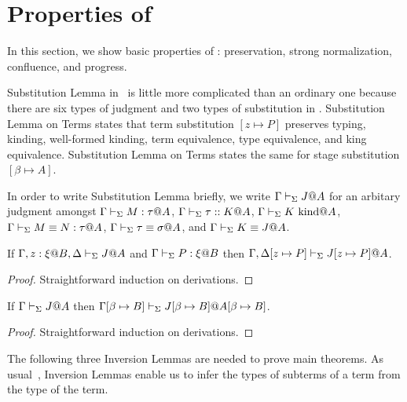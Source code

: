 
\section{Properties of \LMD \label{sec:properties}}

In this section, we show basic properties of \LMD: preservation, strong normalization, confluence, and progress.


Substitution Lemma in \LMD\ is little more complicated than an ordinary one 
because there are six types of judgment and two types of substitution in \LMD.
Substitution Lemma on Terms states that term substitution $[z \mapsto P]$ preserves
typing, kinding, well-formed kinding, term equivalence, type equivalence, and king equivalence.
Substitution Lemma on Terms states the same for stage substitution $[\beta\mapsto A]$.

In order to write Substitution Lemma briefly, we write $\Gamma\vdash_\Sigma J@A$ for an arbitary judgment
amongst $\G\V M:\tau@A$, $\Gamma\vdash_\Sigma \tau::K@A$, $\Gamma\vdash_\Sigma K \text{\ kind} @A$, $\Gamma\vdash_\Sigma M \equiv N : \tau @ A$, 
$\Gamma\vdash_\Sigma \tau \equiv \sigma @ A$, and $\Gamma \vdash_\Sigma K \equiv J @ A$.

\begin{lemma}
	If $\G, z:\xi@B, \D \V J @ A$ and $\Gamma\vdash_\Sigma P:\xi @B$ then $\Gamma, \Delta[z \mapsto P] \vdash_\Sigma J[z \mapsto P] @ A$.
\end{lemma}


\begin{proof}
	Straightforward induction on derivations.
\end{proof}

\begin{lemma}
	If $\Gamma \vdash_\Sigma J @ A$ then $\Gamma[\beta\mapsto B] \vdash_\Sigma J[\beta\mapsto B] @ A[\beta\mapsto B]$.
\end{lemma}

\begin{proof}
	Straightforward induction on derivations.
\end{proof}


The following three Inversion Lemmas are needed to prove main theorems.
As usual~\cite{TAPL}, Inversion Lemmas enable us to infer the types of subterms of a term from the type of the term.

